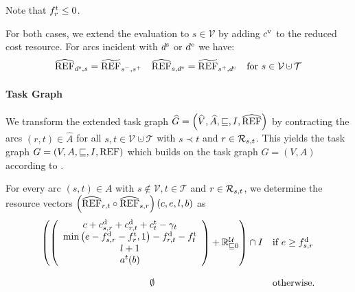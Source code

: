 Note that ${f^{\operatorname{t}}_r\leq 0}$.

For both cases, we extend the evaluation to $s\in\mathcal{V}$ by adding $c^{\operatorname{v}}$ to the reduced cost resource. For arcs incident with $d^{\operatorname{s}}$ or $d^{\operatorname{e}}$ we have:
\begin{align*}
	\widehat{\REF}_{\ds,s}=\widetilde{\REF}_{s^-,s^+} && \widehat{\REF}_{s,\de}=\widetilde{\REF}_{s^+,\de} && \text{for } s\in\mathcal{V}\cupdot\mathcal{T}
\end{align*}

\paragraph{Task Graph} \parfill

We transform the extended task graph ${\widehat{G}=\left(\widehat{V},\widehat{A},\sqsubseteq,I,\widehat{\operatorname{REF}}\right)}$ by contracting the arcs ${(r,t)\in\widehat{A}}$ for all ${s,t\in\mathcal{V}\cupdot\mathcal{T}}$ with ${s\prec t}$ and ${r\in\mathcal{R}_{s,t}}$. This yields the task graph ${G=\left(V,A,\sqsubseteq,I,\operatorname{REF}\right)}$ which builds on the task graph ${G=\left(V,A\right)}$ according to .

For every arc $(s,t)\in A$ with $s\notin\mathcal{V}, t\in\mathcal{T}$ and $r\in\mathcal{R}_{s,t}$, we determine the resource vectors ${\left(\widehat{\operatorname{REF}}_{r,t}\circ\widehat{\operatorname{REF}}_{s,r}\right)(c,e,l,b)}$ as
\begin{align*}
	\begin{array}{cl}
		\left(\left( \begin{array}{c}
			c + c^{\operatorname{d}}_{s,r} + c^{\operatorname{d}}_{r,t} + c^{\operatorname{t}}_t - \gamma_t \\ \min\left(e-f^{\operatorname{d}}_{s,r}-f^{\operatorname{t}}_r, 1\right) - f^{\operatorname{d}}_{r,t} - f^{\operatorname{t}}_t \\ l + 1 \\ a^t(b)
		\end{array} \right) + \mathbb{R}^{\mathcal{U}}_{\sqsubseteq 0} \right) \cap I & \text{if } e\geq f^{\operatorname{d}}_{s,r} \\
		\\
		\emptyset & \text{otherwise.}
	\end{array}
\end{align*}

